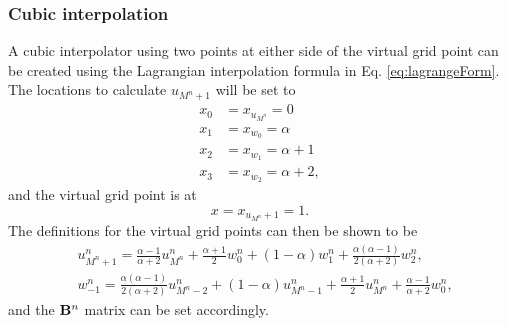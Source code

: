 \subsubsection{Cubic interpolation}
A cubic interpolator using two points at either side of the virtual grid point can be created using the Lagrangian interpolation formula in Eq. \eqref{eq:lagrangeForm}. The locations to calculate $u_{M^n+1}$ will be set to
\begin{equation}
    \begin{aligned}
     x_0 &= x_{u_{M^n}} = 0 \\
     x_1 &= x_{w_0} = \alpha \\
     x_2& = x_{w_1} = \alpha + 1 \\
     x_3 &= x_{w_2} = \alpha + 2,
    \end{aligned}
\end{equation}
and the virtual grid point is at
\begin{equation}
    x = x_{u_{M^n}+1} = 1.
\end{equation}
The definitions for the virtual grid points can then be shown to be
\begin{subequations}\label{eq:cubicVirtualGridpoints}
    \begin{align}
            &u_{M^n+1}^n = \frac{\alpha - 1}{\alpha + 2}u_{M^n}^n + \frac{\alpha + 1}{2}w_0^n + (1-\alpha)w_1^n + \frac{\alpha (\alpha - 1)}{2(\alpha+2)}w_2^n,\\
            &w_{-1}^n = \frac{\alpha (\alpha - 1)}{2(\alpha+2)}u_{M^n-2}^n + (1-\alpha) u_{M^n-1}^n + \frac{\alpha+1}{2} u_{M^n}^n+ \frac{\alpha - 1}{\alpha + 2}w_{0}^n,
    \end{align}
\end{subequations}
and the $\mathbf{B}^n$ matrix can be set accordingly. 

